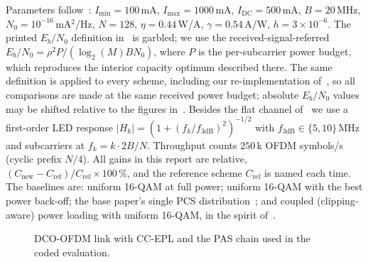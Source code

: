 \documentclass[conference]{IEEEtran}
\begin{document}
Parameters follow~\cite{pham2026}: $I_{\min}=100$\,mA, $I_{\max}=1000$\,mA, $I_{\mathrm{DC}}=500$\,mA, $B=20$\,MHz, $N_0=10^{-16}$\,mA$^2$/Hz, $N=128$, $\eta=0.44$\,W/A, $\gamma=0.54$\,A/W, $h=3\times10^{-6}$. The printed $E_b/N_0$ definition in~\cite{pham2026} is garbled; we use the received-signal-referred $E_b/N_0=\rho^2P/(\log_2(M)BN_0)$, where $P$ is the per-subcarrier power budget, which reproduces the interior capacity optimum described there. The same definition is applied to every scheme, including our re-implementation of~\cite{pham2026}, so all comparisons are made at the same received power budget; absolute $E_b/N_0$ values may be shifted relative to the figures in~\cite{pham2026}. Besides the flat channel of~\cite{pham2026} we use a first-order LED response $|H_k|=(1+(f_k/f_{3\mathrm{dB}})^2)^{-1/2}$ with $f_{3\mathrm{dB}}\in\{5,10\}$\,MHz and subcarriers at $f_k=k\cdot 2B/N$. Throughput counts $250$\,k OFDM symbols/s (cyclic prefix $N/4$). All gains in this report are relative, $(C_{\mathrm{new}}-C_{\mathrm{ref}})/C_{\mathrm{ref}}\times100\,\%$, and the reference scheme $C_{\mathrm{ref}}$ is named each time. The baselines are: uniform 16-QAM at full power; uniform 16-QAM with the best power back-off; the base paper's single PCS distribution~\cite{pham2026}; and coupled (clipping-aware) power loading with uniform 16-QAM, in the spirit of~\cite{ling2020}.

\begin{figure}[t]\centering
{}
\caption{DCO-OFDM link with CC-EPL and the PAS chain used in the coded evaluation.}\label{fig:block}
\end{figure}
\end{document}
